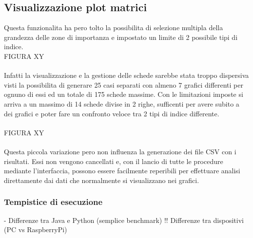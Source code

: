 \subsection{Visualizzazione plot matrici}
Questa funzionalita ha pero tolto la possibilita di selezione multipla della grandezza delle zone di importanza
e impostato un limite di 2 possibile tipi di indice.
\\
FIGURA XY\\
\\
Infatti la visualizzazione e la gestione delle schede sarebbe stata troppo dispersiva visti la possibilita di
generare 25 casi separati con almeno 7 grafici differenti per ognuno di essi ed un totale di 175 schede massime.
Con le limitazioni imposte si arriva a un massimo di 14 schede divise in 2 righe, sufficenti per avere subito
a dei grafici e poter fare un confronto veloce tra 2 tipi di indice differente.\\
\\
FIGURA XY\\
\\
Questa piccola variazione pero non influenza la generazione dei file CSV con i risultati. Essi non vengono cancellati
e, con il lancio di tutte le procedure mediante l'interfaccia, possono essere facilmente reperibili per effettuare
analisi direttamente dai dati che normalmente si visualizzano nei grafici.

\subsubsection{Tempistice di esecuzione}
- Differenze tra Java e Python (semplice benchmark)
!! Differenze tra dispositivi (PC vs RaspberryPi)
